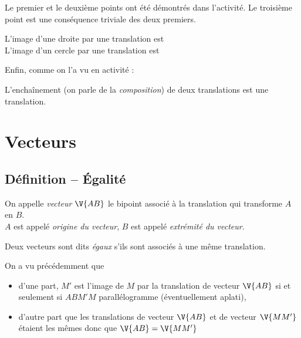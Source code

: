 Le premier et le deuxi\`eme points ont \'et\'e d\'emontr\'es dans l'activit\'e. Le troisi\`eme point est une cons\'equence triviale des deux premiers.

\begin{prop}[admise]
 L'image d'une droite par une translation est \dotfill\\
 L'image d'un cercle par une translation est \dotfill
\end{prop}


Enfin, comme on l'a vu en activit\'e :

\begin{prop}
 L'encha\^inement (on parle de la \emph{composition}) de deux translations est une translation.
\end{prop}


\section{Vecteurs}

\subsection{D\'efinition -- \'Egalit\'e}

\begin{definition}
 On appelle \emph{vecteur $\V{AB}$} le bipoint associ\'e \`a la translation qui transforme $A$ en $B$.\\
 $A$ est appel\'e \emph{origine du vecteur}, $B$ est appel\'e \emph{extr\'emit\'e du vecteur}.
\end{definition}



\begin{definition}
 Deux vecteurs sont dits \emph{\'egaux} s'ils sont associ\'es \`a une m\^eme translation.
\end{definition}

On a vu pr\'ec\'edemment que
\begin{itemize}
 \item d'une part, $M'$ est l'image de $M$ par la translation de vecteur $\V{AB}$ si et seulement si $ABM'M$ parall\'elogramme (\'eventuellement aplati),
 \item d'autre part que les translations de vecteur $\V{AB}$ et de vecteur $\V{MM'}$ \'etaient les m\^emes donc que $\V{AB}=\V{MM'}$
\end{itemize}


